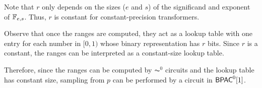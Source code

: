 Note that $r$ only depends on the sizes ($e$ and $s$) of the significand and exponent of $\mathbb{F}_{e,s}$.
Thus, $r$ is constant for constant-precision transformers.

Observe that once the ranges are computed, they act as a lookup table with one entry for each number in $[0,1)$ whose binary representation has $r$ bits.
Since $r$ is a constant, the ranges can be interpreted as a constant-size lookup table.


Therefore, since the ranges can be computed by $\AC^0$ circuits and the lookup table has constant size, sampling from $p$ can be performed by a circuit in $\mathsf{BPAC}^0[1]$.